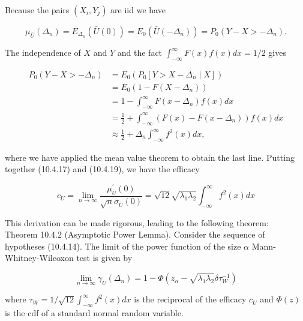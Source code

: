 Because the pairs $\left(X_{i}, Y_{j}\right)$ are iid we have


\begin{equation*}
\mu_{\bar{U}}\left(\Delta_{n}\right)=E_{\Delta_{n}}(\bar{U}(0))=E_{0}\left(\bar{U}\left(-\Delta_{n}\right)\right)=P_{0}\left(Y-X>-\Delta_{n}\right) . \tag{10.4.18}
\end{equation*}


The independence of $X$ and $Y$ and the fact $\int_{-\infty}^{\infty} F(x) f(x) d x=1 / 2$ gives


\begin{align*}
P_{0}\left(Y-X>-\Delta_{n}\right) & =E_{0}\left(P_{0}\left[Y>X-\Delta_{n} \mid X\right]\right) \\
& =E_{0}\left(1-F\left(X-\Delta_{n}\right)\right) \\
& =1-\int_{-\infty}^{\infty} F\left(x-\Delta_{n}\right) f(x) d x \\
& =\frac{1}{2}+\int_{-\infty}^{\infty}\left(F(x)-F\left(x-\Delta_{n}\right)\right) f(x) d x \\
& \approx \frac{1}{2}+\Delta_{n} \int_{-\infty}^{\infty} f^{2}(x) d x, \tag{10.4.19}
\end{align*}


where we have applied the mean value theorem to obtain the last line. Putting together (10.4.17) and (10.4.19), we have the efficacy


\begin{equation*}
c_{U}=\lim _{n \rightarrow \infty} \frac{\mu_{\bar{U}}^{\prime}(0)}{\sqrt{n} \sigma_{\bar{U}}(0)}=\sqrt{12} \sqrt{\lambda_{1} \lambda_{2}} \int_{-\infty}^{\infty} f^{2}(x) d x \tag{10.4.20}
\end{equation*}


This derivation can be made rigorous, leading to the following theorem:\\
Theorem 10.4.2 (Asymptotic Power Lemma). Consider the sequence of hypotheses (10.4.14). The limit of the power function of the size $\alpha$ Mann-Whitney-Wilcoxon test is given by


\begin{equation*}
\lim _{n \rightarrow \infty} \gamma_{U}\left(\Delta_{n}\right)=1-\Phi\left(z_{\alpha}-\sqrt{\lambda_{1} \lambda_{2}} \delta \tau_{W}^{-1}\right) \tag{10.4.21}
\end{equation*}


where $\tau_{W}=1 / \sqrt{12} \int_{-\infty}^{\infty} f^{2}(x) d x$ is the reciprocal of the efficacy $c_{U}$ and $\Phi(z)$ is the cdf of a standard normal random variable.


